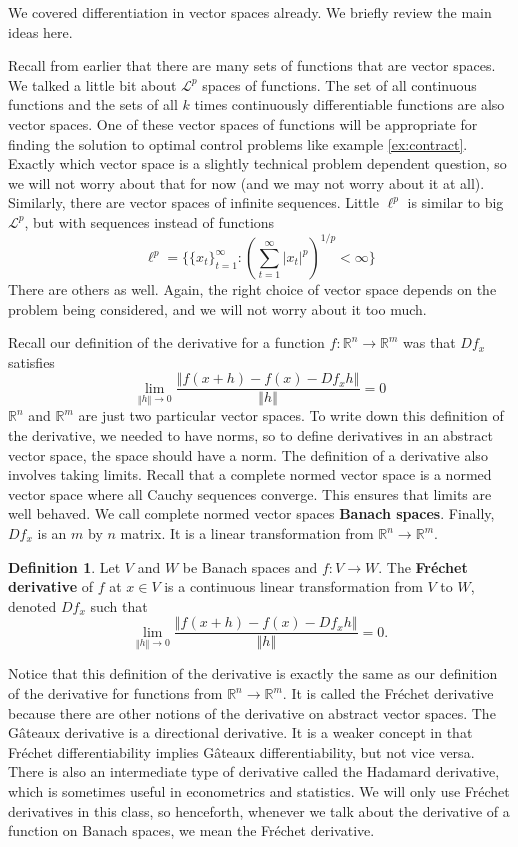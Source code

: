 \documentclass[12pt,reqno]{amsart}
\theoremstyle{definition}
\newtheorem{definition}{Definition}[section]
\def\R{\mathbb{R}}
\newcommand{\norm}[1]{\left\Vert {#1} \right\Vert}
\renewcommand{\to}{{\rightarrow}}
\begin{document}
We covered differentiation in vector spaces already. We briefly review
the main ideas here.

Recall from earlier that there are many sets of functions that are
vector spaces. We talked a little bit about $\mathcal{L}^p$ spaces of
functions. The set of all continuous functions and the sets of all $k$
times continuously differentiable functions are also vector
spaces. One of these vector spaces of functions will be appropriate
for finding the solution to optimal control problems like
example \ref{ex:contract}. Exactly which vector space is a slightly
technical problem dependent question, so we will not worry about that
for now (and we may not worry about it at all). Similarly, there are
vector spaces of infinite sequences. Little $\ell^p$ is similar to big
$\mathcal{L}^p$, but with sequences instead of functions
\[ \ell^p = \{\{x_t\}_{t=1}^\infty:
\left(\sum_{t=1}^\infty |x_t|^p\right)^{1/p} < \infty\} \]
There are others as well. Again, the right choice of vector space
depends on the problem being considered, and we will not worry about
it too much. 

Recall our definition of the derivative for a function  $f:\R^n \to
\R^m$ was that $Df_x$ satisfies
\[ \lim_{\norm{h} \to 0} \frac{\norm{f(x+h) - f(x) - Df_x h}}{\norm{h}}
= 0 \]
 $\R^n$ and $\R^m$ are just two particular vector spaces. To write
down this definition of the derivative, we needed to have norms, so to
define derivatives in an abstract vector space, the space should have
a norm. The definition of a derivative also involves taking
limits. Recall that a complete normed vector space is a normed vector
space where all Cauchy sequences converge. This ensures that limits
are well behaved. We call complete normed vector spaces \textbf{Banach
  spaces}. Finally, $Df_x$ is an $m$ by $n$ matrix. It is a linear
transformation from $\R^n \to \R^m$.
\begin{definition}
  Let $V$ and $W$ be Banach spaces and $f:V \to W$. The
  \textbf{Fr\'{e}chet derivative} of $f$ at $x \in V$ is a continuous
  linear transformation from $V$ to $W$, denoted $Df_x$ such that
  \[ \lim_{\norm{h} \to 0} \frac{\norm{f(x+h) - f(x) - Df_x h
    }}{\norm{h}} = 0. \]
\end{definition}
Notice that this definition of the derivative is exactly the same as our
definition of the derivative for functions from $\R^n \to \R^m$. It is
called the Fr\'{e}chet derivative because there are other notions of
the derivative on abstract vector spaces. The G\^{a}teaux derivative
is a directional derivative. It is a weaker concept in that
Fr\'{e}chet differentiability implies G\^{a}teaux differentiability,
but not vice versa. There is also an intermediate type of derivative
called the Hadamard derivative, which is sometimes useful in
econometrics and statistics. We will only use Fr\'{e}chet derivatives
in this class, so henceforth, whenever we talk about the derivative of
a function on Banach spaces, we mean the Fr\'{e}chet derivative.  
\end{document}
